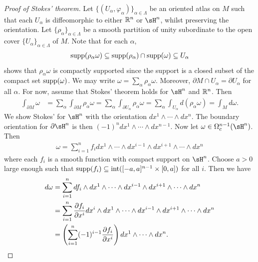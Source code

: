 \begin{proof}[Proof of Stokes' theorem]
    Let $\{(U_{\alpha},\varphi_{\alpha})\}_{\alpha \in \Lambda}$ be an oriented atlas on $M$ such that each $U_{\alpha}$ is diffeomorphic to either $\mathbb{R}^{n}$ or $\sH^{n}$, whilst preserving the orientation. Let $\{\rho_{\alpha}\}_{\alpha \in \Lambda}$ be a smooth partition of unity subordinate to the open cover $\{U_{\alpha}\}_{\alpha \in \Lambda}$ of $M$. Note that for each $\alpha$,
    \begin{align}
        \operatorname{supp}(\rho_{\alpha}\omega) \subseteq \operatorname{supp}(\rho_{\alpha}) \cap \operatorname{supp}(\omega) \subseteq U_{\alpha}
    \end{align}
    shows that $\rho_{\alpha}\omega$ is compactly supported since the support is a closed subset of the compact set $\operatorname{supp}(\omega)$. We may write $\omega = \sum_{\alpha} \rho_{\alpha}\omega$. Moreover, $\partial M \cap U_{\alpha} = \partial U_{\alpha}$ for all $\alpha$. For now, assume that Stokes' theorem holds for $\sH^{n}$ and $\mathbb{R}^{n}$. Then
    \begin{align}
        \int_{\partial M} \omega &= \sum_{\alpha} \int_{\partial M} \rho_{\alpha}\omega = \sum_{\alpha} \int_{\partial U_{\alpha}} \rho_{\alpha}\omega = \sum_{\alpha} \int_{U_{\alpha}} d(\rho_{\alpha}\omega) = \int_{M} d\omega.
    \end{align}
    We show Stokes' for $\sH^{n}$ with the orientation $dx^{1} \wedge \cdots \wedge dx^{n}$. The boundary orientation for $\partial \sH^{n}$ is then $(-1)^{n} dx^{1} \wedge \cdots \wedge dx^{n-1}$. Now let $\omega \in \Omega^{n-1}_{c}(\sH^{n})$. Then
    \begin{align}
        \omega = \sum_{i=1}^{n} f_{i} dx^{1} \wedge \cdots \wedge dx^{i-1} \wedge dx^{i+1} \wedge \cdots \wedge dx^{n}
    \end{align}
    where each $f_{i}$ is a smooth function with compact support on $\sH^{n}$. Choose $a > 0$ large enough such that $\operatorname{supp}(f_{i}) \subseteq \operatorname{int}([-a,a]^{n-1} \times [0,a])$ for all $i$. Then we have
    \begin{align}
        d\omega &= \sum_{i=1}^{n} df_{i} \wedge dx^{1} \wedge \cdots \wedge dx^{i-1} \wedge dx^{i+1} \wedge \cdots \wedge dx^{n} \notag \\
        &= \sum_{i=1}^{n} \frac{\partial f_{i}}{\partial x^{i}} dx^{i} \wedge dx^{1} \wedge \cdots \wedge dx^{i-1} \wedge dx^{i+1} \wedge \cdots \wedge dx^{n} \notag \\
        &= \left(\sum_{i=1}^{n} (-1)^{i-1} \frac{\partial f_{i}}{\partial x^{i}}\right) dx^{1} \wedge \cdots \wedge dx^{n}.

\end{align}
\end{proof}
